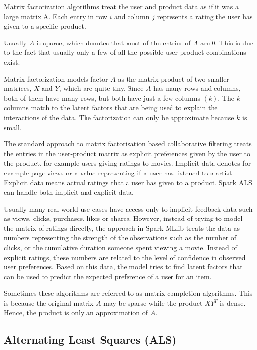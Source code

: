 \documentclass[main.tex]{thesis.tex}
\begin{document}
Matrix factorization algorithms treat the user and product data as if it was a large matrix A.
Each entry in row $i$ and column $j$ represents a rating the user has given to a specific product. \cite{ryza15}

Usually $A$ is sparse, which denotes that most of the entries of $A$ are 0.
This is due to the fact that usually only a few of all the possible user-product combinations exist.

Matrix factorization models factor $A$ as the matrix product of two smaller matrices, $X$ and $Y$, which are quite tiny.
Since $A$ has many rows and columns, both of them have many rows, but both have just a few columns $(k)$. The $k$ columns match to the latent factors that are being used to explain the interactions of the data.
The factorization can only be approximate because $k$ is small. \cite{ryza15}

The standard approach to matrix factorization based collaborative filtering treats the entries in the user-product matrix as explicit preferences given by the user to the product, for example users giving ratings to movies.
Implicit data denotes for example page views or a value representing if a user has listened to a artist. Explicit data means actual ratings that a user has given to a product.
Spark ALS can handle both implicit and explicit data. \cite{spark14} \cite{ryza15}

Usually many real-world use cases have access only to implicit feedback data such as views, clicks, purchases, likes or shares.
However, instead of trying to model the matrix of ratings directly, the approach in Spark MLlib treats the data as numbers representing the strength of the observations such as the number of clicks, or the cumulative duration someone spent viewing a movie.
Instead of explicit ratings, these numbers are related to the level of confidence in observed user preferences.
Based on this data, the model tries to find latent factors that can be used to predict the expected preference of a user for an item. \cite{spark14}

Sometimes these algorithms are referred to as matrix completion algorithms.
This is because the original matrix $A$ may be sparse while the product $XY^T$ is dense.
Hence, the product is only an approximation of $A$. \cite{ryza15}

\subsection{Alternating Least Squares (ALS)}
\end{document}
